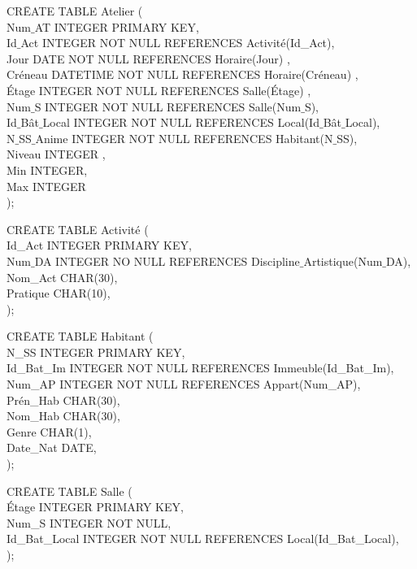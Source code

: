 \documentclass[a4paper,10.5pt]{report}
\begin{document}
		\begin{tabbing}
			CR\=EATE TABLE Atelier (\\
			\> Num$\_$AT INTEGER PRIMARY KEY,\\
			\> Id$\_$Act INTEGER NOT NULL REFERENCES Activité(Id\_Act),\\
            \> Jour DATE NOT NULL REFERENCES Horaire(Jour) ,\\
            \> Créneau DATETIME NOT NULL REFERENCES Horaire(Créneau) ,\\
            \> Étage INTEGER NOT NULL REFERENCES Salle(Étage) ,\\
			\> Num$\_$S INTEGER NOT NULL REFERENCES Salle(Num$\_$S),\\
			\> Id$\_$Bât$\_$Local INTEGER NOT NULL REFERENCES Local(Id$\_$Bât$\_$Local),\\
			\> N$\_$SS$\_$Anime  INTEGER NOT NULL REFERENCES Habitant(N$\_$SS),\\
			\> Niveau INTEGER ,\\
			\> Min INTEGER,\\
			\> Max INTEGER\\);
		\end{tabbing}

		\begin{tabbing}
			CR\=EATE TABLE Activité (\\
			\> Id\_Act INTEGER PRIMARY KEY,\\
			\> Num$\_$DA INTEGER NO NULL REFERENCES Discipline$\_$Artistique(Num$\_$DA),\\
			\> Nom\_Act CHAR(30),\\
			\> Pratique CHAR(10),\\);
		\end{tabbing}

		\begin{tabbing}
			CR\=EATE TABLE Habitant (\\
			\> N\_SS INTEGER PRIMARY KEY,\\
			\> Id\_Bat\_Im INTEGER NOT NULL REFERENCES Immeuble(Id\_Bat\_Im),\\
			\> Num\_AP INTEGER NOT NULL REFERENCES Appart(Num\_AP),\\
			\> Prén\_Hab CHAR(30),\\
			\> Nom\_Hab CHAR(30),\\
			\> Genre CHAR(1),\\
			\> Date\_Nat DATE,\\);
		\end{tabbing}

		\begin{tabbing}
			CR\=EATE TABLE Salle (\\
			\> Étage INTEGER PRIMARY KEY,\\
			\> Num\_S INTEGER NOT NULL,\\
			\> Id\_Bat\_Local INTEGER NOT NULL REFERENCES Local(Id\_Bat\_Local),\\);
		\end{tabbing}
\end{document}

